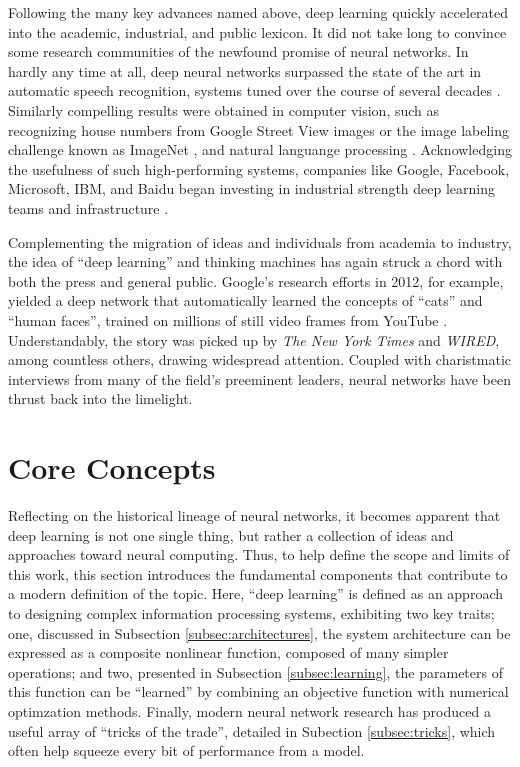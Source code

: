 Following the many key advances named above, deep learning quickly accelerated into the academic, industrial, and public lexicon.
It did not take long to convince some research communities of the newfound promise of neural networks.
In hardly any time at all, deep neural networks surpassed the state of the art in automatic speech recognition, systems tuned over the course of several decades \cite{Hinton2009}.
Similarly compelling results were obtained in computer vision, such as recognizing house numbers from Google Street View images \cite{} or the image labeling challenge known as ImageNet \cite{}, and natural languange processing \cite{Sutskever2010}.
Acknowledging the usefulness of such high-performing systems, companies like Google, Facebook, Microsoft, IBM, and Baidu began investing in industrial strength deep learning teams and infrastructure \cite{Dean2012, LeCun2014}.

Complementing the migration of ideas and individuals from academia to industry, the idea of ``deep learning'' and thinking machines has again struck a chord with both the press and general public.
Google's research efforts in 2012, for example, yielded a deep network that automatically learned the concepts of ``cats'' and ``human faces'', trained on millions of still video frames from YouTube \cite{Le2012}.
Understandably, the story was picked up by \emph{The New York Times} and \emph{WIRED}, among countless others, drawing widespread attention.
Coupled with charistmatic interviews from many of the field's preeminent leaders, neural networks have been thrust back into the limelight. %


\section{Core Concepts}
\label{sec:example}

Reflecting on the historical lineage of neural networks, it becomes apparent that deep learning is not one single thing, but rather a collection of ideas and approaches toward neural computing.
Thus, to help define the scope and limits of this work, this section introduces the fundamental components that contribute to a modern definition of the topic.
Here, ``deep learning'' is defined as an approach to designing complex information processing systems, exhibiting two key traits;
one, discussed in Subsection \ref{subsec:architectures}, the system architecture can be expressed as a composite nonlinear function, composed of many simpler operations;
and two, presented in Subsection \ref{subsec:learning}, the parameters of this function can be ``learned'' by combining an objective function with numerical optimzation methods.
Finally, modern neural network research has produced a useful array of ``tricks of the trade'', detailed in Subection \ref{subsec:tricks}, which often help squeeze every bit of performance from a model.


